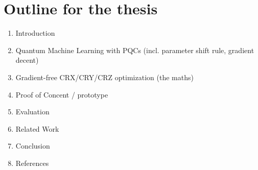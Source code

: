 \chapter{Outline for the thesis}

\begin{enumerate}
    \item Introduction
    \item Quantum Machine Learning with PQCs (incl. parameter shift rule, gradient decent)
    \item Gradient-free CRX/CRY/CRZ optimization (the maths)
    \item Proof of Concent / prototype
    \item Evaluation
    \item Related Work
    \item Conclusion
    \item References
\end{enumerate}